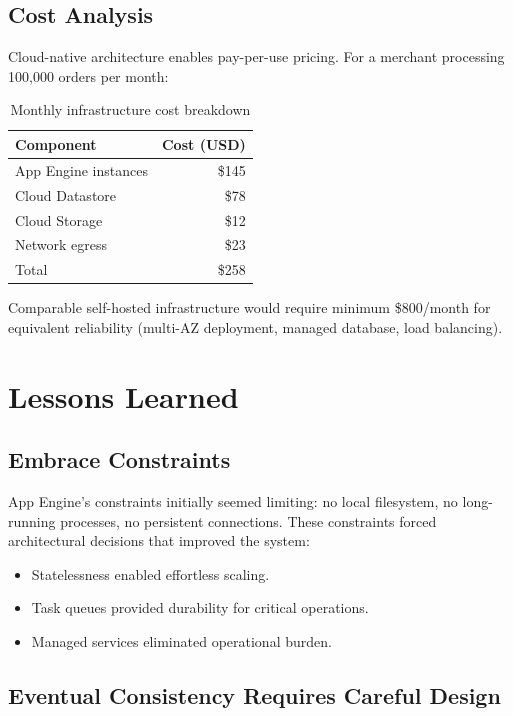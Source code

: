 \documentclass[11pt,twocolumn]{article}
\begin{document}
\subsection{Cost Analysis}

Cloud-native architecture enables pay-per-use pricing. For a merchant processing 100,000 orders per month:

\begin{table}[h]
\centering
\caption{Monthly infrastructure cost breakdown}
\label{tab:cost}
\begin{tabular}{lr}
\hline
Component & Cost (USD) \\
\hline
App Engine instances & \$145 \\
Cloud Datastore & \$78 \\
Cloud Storage & \$12 \\
Network egress & \$23 \\
\hline
Total & \$258 \\
\hline
\end{tabular}
\end{table}

Comparable self-hosted infrastructure would require minimum \$800/month for equivalent reliability (multi-AZ deployment, managed database, load balancing).

\section{Lessons Learned}

\subsection{Embrace Constraints}

App Engine's constraints initially seemed limiting: no local filesystem, no long-running processes, no persistent connections. These constraints forced architectural decisions that improved the system:
\begin{itemize}
\item Statelessness enabled effortless scaling.
\item Task queues provided durability for critical operations.
\item Managed services eliminated operational burden.
\end{itemize}

\subsection{Eventual Consistency Requires Careful Design}
\end{document}
